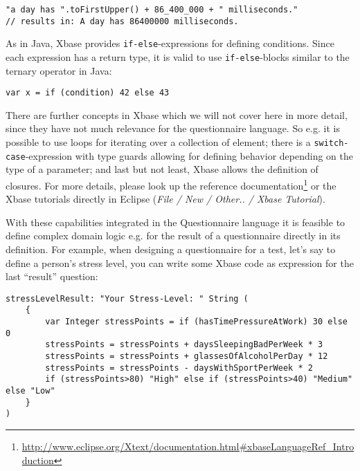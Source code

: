 \begin{lstlisting}[language=Xbase]
"a day has ".toFirstUpper() + 86_400_000 + " milliseconds."
// results in: A day has 86400000 milliseconds.
\end{lstlisting}

As in Java, Xbase provides \texttt{if-else}-expressions for defining conditions. Since each expression
has a return type, it is valid to use  \texttt{if-else}-blocks similar to the ternary operator in Java:

\begin{lstlisting}[language=Xbase]
var x = if (condition) 42 else 43
\end{lstlisting}

There are further concepts in Xbase which we will not cover here in more detail, since they have
not much relevance for the questionnaire language. So e.g. it is possible to use loops for
iterating over a collection of element; there is a \texttt{switch-case}-expression
with type guards allowing for defining behavior depending on the type of a parameter; and last but
not least, Xbase allows the definition of closures. For more details, please look up the reference
documentation\footnote{\url{http://www.eclipse.org/Xtext/documentation.html#xbaseLanguageRef_Introduction}}
or the Xbase tutorials directly in Eclipse (\emph{File / New / Other.. / Xbase Tutorial}). 

With these capabilities integrated in the Questionnaire language it is feasible to define complex
domain logic e.g. for the result of a questionnaire directly in its definition. For example, when
designing a questionnaire for a test, let's say to define a person's stress level, you can write
some Xbase code as expression for the last ``result'' question:

\begin{lstlisting}[language=Xbase]
stressLevelResult: "Your Stress-Level: " String (
	{
		var Integer stressPoints = if (hasTimePressureAtWork) 30 else 0
		stressPoints = stressPoints + daysSleepingBadPerWeek * 3
		stressPoints = stressPoints + glassesOfAlcoholPerDay * 12
		stressPoints = stressPoints - daysWithSportPerWeek * 2
		if (stressPoints>80) "High" else if (stressPoints>40) "Medium" else "Low"
	}
) 
\end{lstlisting}
